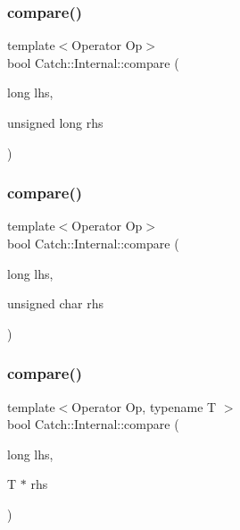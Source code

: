 \mbox{\label{namespace_catch_1_1_internal_ae9aec44a08d9cbb0d3dd46d438b50d2c}} 
\subsubsection{compare()\hspace{0.1cm}{\footnotesize\ttfamily [12/17]}}
{\footnotesize\ttfamily template$<$Operator Op$>$ \\
bool Catch\+::\+Internal\+::compare (\begin{DoxyParamCaption}\item[{long}]{lhs,  }\item[{unsigned long}]{rhs }\end{DoxyParamCaption})}

\mbox{\label{namespace_catch_1_1_internal_a79664b5f5f497fba57bd156e098de1f2}} 
\subsubsection{compare()\hspace{0.1cm}{\footnotesize\ttfamily [13/17]}}
{\footnotesize\ttfamily template$<$Operator Op$>$ \\
bool Catch\+::\+Internal\+::compare (\begin{DoxyParamCaption}\item[{long}]{lhs,  }\item[{unsigned char}]{rhs }\end{DoxyParamCaption})}

\mbox{\label{namespace_catch_1_1_internal_a829570ad9e724c687aa42190a696032b}} 
\subsubsection{compare()\hspace{0.1cm}{\footnotesize\ttfamily [14/17]}}
{\footnotesize\ttfamily template$<$Operator Op, typename T $>$ \\
bool Catch\+::\+Internal\+::compare (\begin{DoxyParamCaption}\item[{long}]{lhs,  }\item[{T $\ast$}]{rhs }\end{DoxyParamCaption})}

